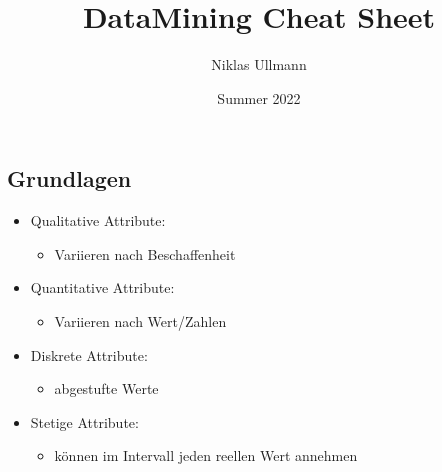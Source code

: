 \documentclass[a4paper]{article}
\title{DataMining Cheat Sheet}
\author{Niklas Ullmann}
\date{Summer 2022}
\begin{document}
\begin{landscape}
    \thispagestyle{empty}

    \begin{multicols}{3}
        
    \section{Grundlagen}
        \begin{itemize}[noitemsep,nolistsep]
            \item Qualitative Attribute: 
                \begin{itemize}
                    \item Variieren nach Beschaffenheit
                \end{itemize}
            \item Quantitative Attribute:
                \begin{itemize}
                    \item Variieren nach Wert/Zahlen
                \end{itemize}
        \end{itemize}
        \begin{itemize}[noitemsep,nolistsep]
            \item Diskrete Attribute: 
                \begin{itemize}
                    \item abgestufte Werte
                \end{itemize}
            \item Stetige Attribute:
                \begin{itemize}
                    \item können im Intervall jeden reellen Wert annehmen
                \end{itemize}
        \end{itemize}

\end{multicols}
\end{landscape}
\end{document}

